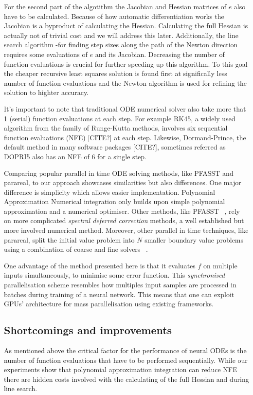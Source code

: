 \documentclass[11pt]{article}
\begin{document}
    For the second part of the algotithm the Jacobian and Hessian matrices of $e$ also have to be calculated.
    Because of how automatic differentiation works the Jacobian is a byproduct of calculating the Hessian.
    Calculating the full Hessian is actually not of trivial cost and we will address this later.
    Additionally, the line search algorithm -for finding step sizes along the path of the Newton direction requires
    some evaluations of $e$ and its Jacobian.
    Decreasing the number of function evaluations is crucial for further speeding up this algorithm.
    To this goal the cheaper recursive least squares solution is found first at significally less number of function
    evaluations and the Newton algorithm is used for refining the solution to highter accuracy.

    It's important to note that traditional ODE numerical solver also take more that 1 (serial) function evaluations at
    each step.
    For example RK45, a widely used algorithm from the family of Runge-Kutta methods, involves six sequential function
    evaluations (NFE) [CITE?] at each step.
    Likewise, Dormand-Prince, the default method in many software packages [CITE?], sometimes referred as DOPRI5 also
    has an NFE of 6 for a single step.

    Comparing popular parallel in time ODE solving methods, like PFASST and parareal, to our approach showcases
    similarities but also differences.
    One major difference is simplicity which allows easier implementation.
    Polynomial Approximation Numerical integration only builds upon simple polynomial approximation and a numerical
    optimiser.
    Other methods, like PFASST ~\cite{emmett2012toward}, rely on more complicated \textit{spectral deferred correction}
    methods, a well established but more involved numerical method.
    Moreover, other parallel in time techniques, like parareal, split the initial value problem into $N$ smaller boundary
    value problems using a combination of coarse and fine solvers ~\cite{maday2002parareal}.

    One advantage of the method presented here is that it evaluates $f$ on multiple inputs simultaneously,
    to minimise some error function.
    This \textit{synchronised} parallelisation scheme resembles how multiples input samples are processed in batches
    during training of a neural network.
    This means that one can exploit GPUs' architecture for mass parallelisation using existing frameworks.

    \subsection{Shortcomings and improvements}
    As mentioned above the critical factor for the performance of neural ODEs is the number of function evaluations that
    have to be performed sequentially.
    While our experiments show that polynomial approximation integration can reduce NFE there are hidden costs involved
    with the calculating of the full Hessian and during line search.
\end{document}
